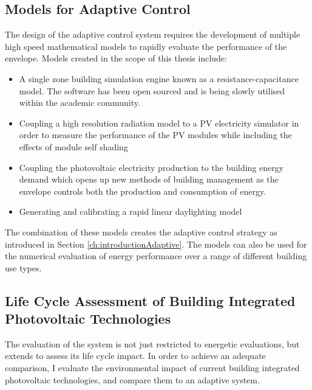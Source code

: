 \subsection{Models for Adaptive Control}
The design of the adaptive control system requires the development of multiple high speed mathematical models to rapidly evaluate the performance of the envelope. Models created in the scope of this thesis include:
\begin{itemize}
\item A single zone building simulation engine known as a resistance-capacitance model. The software has been open sourced and is being slowly utilised within the academic community. 
\item Coupling a high resolution radiation model to a PV electricity simulator in order to measure the performance of the PV modules while including the effects of module self shading
\item Coupling the photovoltaic electricity production to the building energy demand which opens up new methods of building management as the envelope controls both the production and consumption of energy. 
\item Generating and calibrating a rapid linear daylighting model 
\end{itemize}

The combination of these models creates the adaptive control strategy as introduced in Section \ref{ch:introductionAdaptive}. The models can also be used for the numerical evaluation of energy performance over a range of different building use types.

\subsection{Life Cycle Assessment of Building Integrated Photovoltaic Technologies}
The evaluation of the system is not just restricted to energetic evaluations, but extends to assess its life cycle impact. In order to achieve an adequate comparison, I evaluate the environmental impact of current building integrated photovoltaic technologies, and compare them to an adaptive system. 



